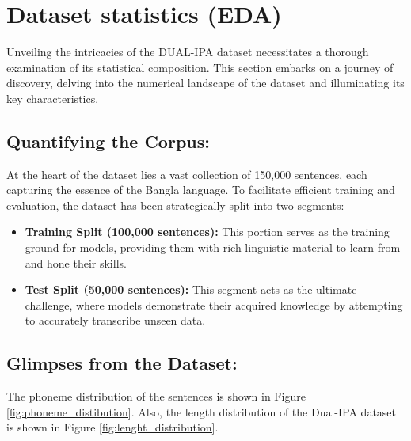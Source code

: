 

\section{Dataset statistics (EDA)}
Unveiling the intricacies of the DUAL-IPA dataset necessitates a thorough examination of its statistical composition. This section embarks on a journey of discovery, delving into the numerical landscape of the dataset and illuminating its key characteristics.

\subsection{Quantifying the Corpus:}
At the heart of the dataset lies a vast collection of 150,000 sentences, each capturing the essence of the Bangla language. To facilitate efficient training and evaluation, the dataset has been strategically split into two segments:
\begin{itemize}
    \item \textbf{Training Split (100,000 sentences):} This portion serves as the training ground for models, providing them with rich linguistic material to learn from and hone their skills.
    \item \textbf{Test Split (50,000 sentences):} This segment acts as the ultimate challenge, where models demonstrate their acquired knowledge by attempting to accurately transcribe unseen data.
\end{itemize}

\subsection{Glimpses from the Dataset:}
The phoneme distribution of the sentences is shown in Figure \ref{fig:phoneme_distibution}. Also, the length distribution of the Dual-IPA dataset is shown in Figure \ref{fig:lenght_distribution}.

